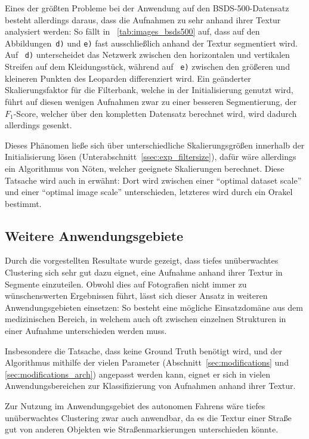 Eines der größten Probleme bei der Anwendung auf den BSDS-500-Datensatz besteht allerdings daraus, dass die Aufnahmen zu sehr anhand ihrer Textur analysiert werden: So fällt in \tablename~\ref{tab:images_bsds500} auf, dass \bspw auf den Abbildungen~\texttt{d)} und \texttt{e)} fast ausschließlich anhand der Textur segmentiert wird. Auf \figurename~\texttt{d)} unterscheidet das Netzwerk zwischen den horizontalen und vertikalen Streifen auf dem Kleidungsstück, während auf \figurename~\texttt{e)} zwischen den größeren und kleineren Punkten des Leoparden differenziert wird. Ein geänderter Skalierungsfaktor für die Filterbank, welche in der Initialisierung genutzt wird, führt auf diesen wenigen Aufnahmen zwar zu einer besseren Segmentierung, der $F_1$-Score, welcher über den kompletten Datensatz berechnet wird, wird dadurch allerdings gesenkt.

Dieses Phänomen ließe sich über unterschiedliche Skalierungsgrößen innerhalb der Initialisierung lösen (\vgl Unterabschnitt~\ref{ssec:exp_filtersize}), dafür wäre allerdings ein Algorithmus von Nöten, welcher geeignete Skalierungen berechnet. Diese Tatsache wird auch in \cite{arbelaez_10} erwähnt: Dort wird zwischen einer \enquote{optimal dataset scale} und einer \enquote{optimal image scale} unterschieden, letzteres wird durch ein Orakel bestimmt.

\subsection{Weitere Anwendungsgebiete}

Durch die vorgestellten Resultate wurde gezeigt, dass tiefes unüberwachtes Clustering sich sehr gut dazu eignet, eine Aufnahme anhand ihrer Textur in Segmente einzuteilen. Obwohl dies auf Fotografien nicht immer zu wünschenswerten Ergebnissen führt, lässt sich dieser Ansatz in weiteren Anwendungsgebieten einsetzen: So besteht eine mögliche Einsatzdomäne aus dem medizinischen Bereich, in welchem auch oft zwischen einzelnen Strukturen in einer Aufnahme unterschieden werden muss.

Insbesondere die Tatsache, dass keine Ground Truth benötigt wird, und der Algorithmus mithilfe der vielen Parameter (\vgl Abschnitt~\ref{sec:modifications} und \ref{sec:modifications_arch}) angepasst werden kann, eignet er sich in vielen Anwendungsbereichen zur Klassifizierung von Aufnahmen anhand ihrer Textur.

Zur Nutzung im Anwendungsgebiet des autonomen Fahrens wäre tiefes unüberwachtes Clustering zwar auch anwendbar, da es \bspw die Textur einer Straße gut von anderen Objekten wie Straßenmarkierungen unterschieden könnte.